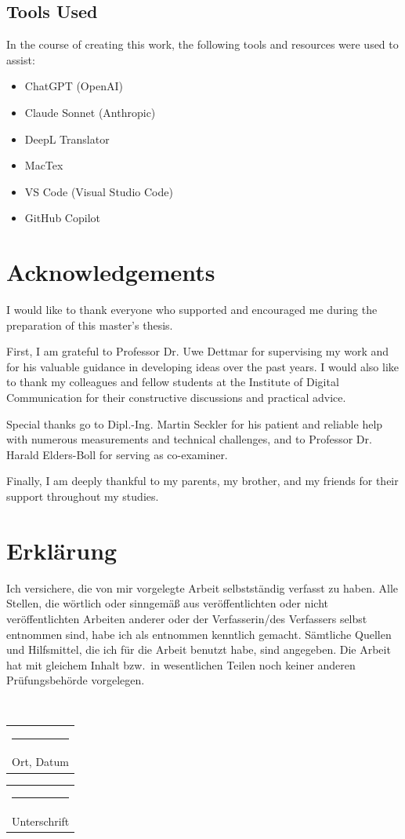 \documentclass[12pt, english, openany]{book}
\begin{document}
\clearpage
\section*{Tools Used}
In the course of creating this work, the following tools and resources were used to assist:

\begin{itemize}
    \item ChatGPT (OpenAI)
    \item Claude Sonnet (Anthropic)
    \item DeepL Translator
    \item MacTex
    \item VS Code (Visual Studio Code)
    \item GitHub Copilot
\end{itemize}

\chapter{Acknowledgements} \label{chap:acknowledgements}
I would like to thank everyone who supported and encouraged me during the preparation of this master’s thesis.

First, I am grateful to Professor Dr. Uwe Dettmar for supervising my work and for his valuable guidance in developing ideas over the past years. I would also like to thank my colleagues and fellow students at the Institute of Digital Communication for their constructive discussions and practical advice.

Special thanks go to Dipl.-Ing. Martin Seckler for his patient and reliable help with numerous measurements and technical challenges, and to Professor Dr. Harald Elders-Boll for serving as co-examiner.

Finally, I am deeply thankful to my parents, my brother, and my friends for their support throughout my studies.

\chapter*{Erklärung}
%
Ich versichere, die von mir vorgelegte Arbeit selbstständig verfasst zu haben. Alle Stellen, die wörtlich oder sinngemäß aus veröffentlichten oder nicht veröffentlichten Arbeiten anderer oder der Verfasserin/des Verfassers selbst entnommen sind, habe ich als entnommen kenntlich gemacht. Sämtliche Quellen und Hilfsmittel, die ich für die Arbeit benutzt habe, sind angegeben. Die Arbeit hat mit gleichem Inhalt bzw.\ in wesentlichen Teilen noch keiner anderen Prüfungsbehörde vorgelegen.
\par
\\[3cm]
%
\begin{tabular}{@{}l@{}}%
    \rule{0.35\textwidth}{0.4pt} \\
    Ort, Datum%
\end{tabular}%
\hfill%
\begin{tabular}{@{}l@{}}%
    \rule{0.45\textwidth}{0.4pt} \\
    Unterschrift%
\end{tabular}%

\listoffigures
\listoftables
\printglossary[type=acronym]
\printbibliography
\end{document}
